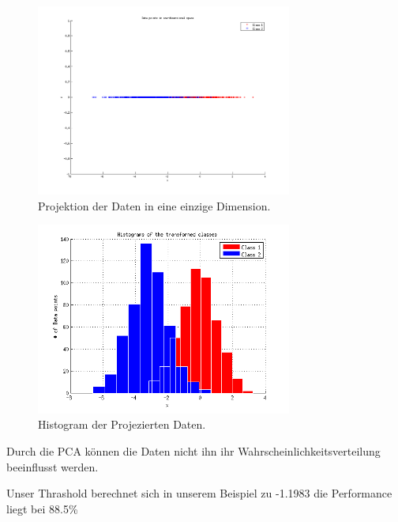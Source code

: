 \begin{figure}[h!]
  \begin{center}
    \includegraphics[width=0.75\textwidth]{./figures/4_one_dim}
    \caption{Projektion der Daten in eine einzige Dimension.}
    \label{fig:4_one_dim}
  \end{center}
\end{figure}

\begin{figure}[h!]
  \begin{center}
    \includegraphics[width=0.75\textwidth]{./figures/4_Histogram}
    \caption{Histogram der Projezierten Daten.}
    \label{fig:4_Histogram}
  \end{center}
\end{figure}


Durch die PCA können die Daten nicht ihn ihr Wahrscheinlichkeitsverteilung beeinflusst werden.

Unser Thrashold berechnet sich in unserem Beispiel zu -1.1983 die Performance liegt bei 88.5\% 



